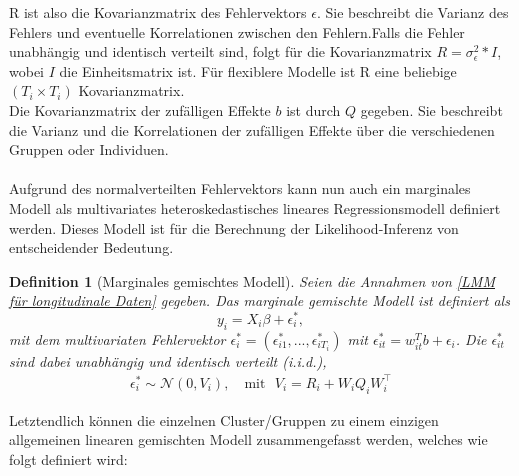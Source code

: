 \documentclass[%
thesis=student,%
coverpage=false,%
titlepage=false,%
headmarks=true, %
german,%
font=libertine, %
math=newpxtx, %
BCOR=5mm,%
coverBCOR=11mm%
]{tumbook}
\theoremstyle{break}
\newtheorem{definition}{Definition}[section]
\begin{document}
R ist also die Kovarianzmatrix des Fehlervektors $\epsilon$. Sie beschreibt die Varianz des Fehlers und eventuelle Korrelationen zwischen den Fehlern.Falls die Fehler unabhängig und identisch verteilt sind, folgt für die Kovarianzmatrix $R=\sigma_\epsilon^2 * I$, wobei $I$ die Einheitsmatrix ist. Für flexiblere Modelle ist R eine beliebige $(T_i \times T_i)$ Kovarianzmatrix.\\ Die Kovarianzmatrix der zufälligen Effekte $b$ ist durch $Q$ gegeben. Sie beschreibt die Varianz und die Korrelationen der zufälligen Effekte über die verschiedenen Gruppen oder Individuen.\\
\\
Aufgrund des normalverteilten Fehlervektors kann nun auch ein marginales Modell als multivariates heteroskedastisches lineares Regressionsmodell definiert werden. Dieses Modell ist für die Berechnung der Likelihood-Inferenz von entscheidender Bedeutung. 
\begin{definition}[Marginales gemischtes Modell]
	Seien die Annahmen von \ref{LMM für longitudinale Daten} gegeben. 
	Das marginale gemischte Modell ist definiert als
	$$ y_i = X_i\beta + \epsilon_i^*,$$
	mit dem multivariaten Fehlervektor $\epsilon_i^* = (\epsilon_{i1}^*,...,\epsilon_{iT_i}^*) $ mit $\epsilon_{it}^* = w_{it}^Tb + \epsilon_i$. 
	Die $\epsilon_{it}^*$ sind dabei unabhängig und identisch verteilt (i.i.d.),
	\begin{align}
		\epsilon_i^* \sim \mathcal{N}(0,V_i), \hspace{12pt}\text{mit} \hspace{8pt}V_i = R_i + W_i Q_i W_i^{\top}
	\end{align}
	\label{spez-marginales-Modell}
\end{definition} \noindent
Letztendlich können die einzelnen Cluster/Gruppen zu einem einzigen allgemeinen linearen gemischten Modell zusammengefasst werden, welches wie folgt definiert wird:
\end{document}
